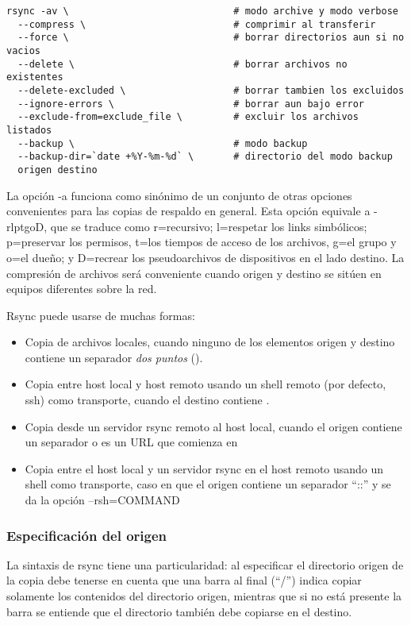 \begin{lstlisting}
rsync -av \                             # modo archive y modo verbose
  --compress \                          # comprimir al transferir
  --force \                             # borrar directorios aun si no vacios
  --delete \                            # borrar archivos no existentes
  --delete-excluded \                   # borrar tambien los excluidos
  --ignore-errors \                     # borrar aun bajo error
  --exclude-from=exclude_file \         # excluir los archivos listados
  --backup \                            # modo backup
  --backup-dir=`date +%Y-%m-%d` \       # directorio del modo backup
  origen destino
\end{lstlisting}

La opción -a funciona como sinónimo de un conjunto de otras opciones convenientes para las copias de respaldo en general. Esta opción equivale a -rlptgoD, que se traduce como r=recursivo; l=respetar los links simbólicos; p=preservar los permisos, t=los tiempos de acceso de los archivos, g=el grupo y o=el dueño; y D=recrear los pseudoarchivos de dispositivos en el lado destino. La compresión de archivos será conveniente cuando origen y destino se sitúen en equipos diferentes sobre la red.


Rsync puede usarse de muchas formas:
\begin{itemize}
	\item Copia de archivos locales, cuando ninguno de los elementos origen y destino contiene un separador \emph{dos puntos} (\quotes{:}).
	\item Copia entre host local y host remoto usando un shell remoto (por defecto, ssh) como transporte, cuando el destino contiene \quotes{:}.
	\item Copia desde un servidor rsync remoto al host local, cuando el origen contiene un separador \quotes{::} o es un URL que comienza en 
	\item Copia entre el host local y un servidor rsync en el host remoto usando un shell como transporte, caso en que el origen contiene un separador “::” y se da la opción –rsh=COMMAND
\end{itemize}


\subsubsection{Especificación del origen}

La sintaxis de rsync tiene una particularidad: al especificar el directorio origen de la copia debe tenerse en cuenta que una barra al final (“/”) indica copiar solamente los contenidos del directorio origen, mientras que si no está presente la barra se entiende que el directorio también debe copiarse en el destino. 

